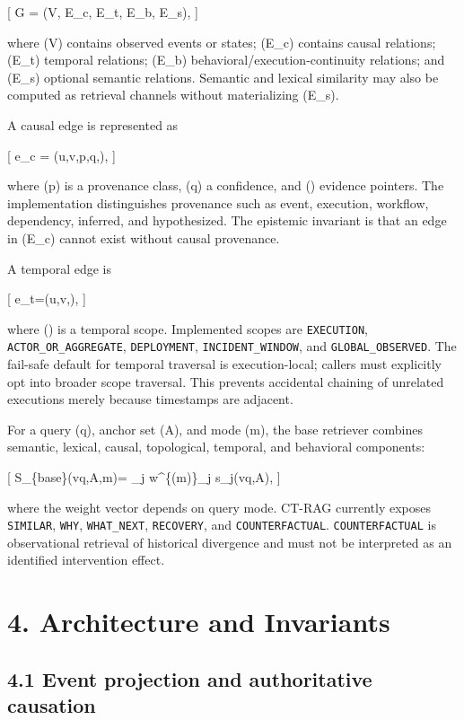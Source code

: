 \documentclass[
  11pt,
]{article}
\begin{document}
{[} G = (V, E\_c, E\_t, E\_b, E\_s), {]}

where (V) contains observed events or states; (E\_c) contains causal
relations; (E\_t) temporal relations; (E\_b)
behavioral/execution-continuity relations; and (E\_s) optional semantic
relations. Semantic and lexical similarity may also be computed as
retrieval channels without materializing (E\_s).

A causal edge is represented as

{[} e\_c = (u,v,p,q,), {]}

where (p) is a provenance class, (q\in[0,1]) a confidence, and
() evidence pointers. The implementation distinguishes
provenance such as event, execution, workflow, dependency, inferred, and
hypothesized. The epistemic invariant is that an edge in (E\_c) cannot
exist without causal provenance.

A temporal edge is

{[} e\_t=(u,v,\sigma), {]}

where (\sigma) is a temporal scope. Implemented scopes are
\texttt{EXECUTION}, \texttt{ACTOR\_OR\_AGGREGATE}, \texttt{DEPLOYMENT},
\texttt{INCIDENT\_WINDOW}, and \texttt{GLOBAL\_OBSERVED}. The fail-safe
default for temporal traversal is execution-local; callers must
explicitly opt into broader scope traversal. This prevents accidental
chaining of unrelated executions merely because timestamps are adjacent.

For a query (q), anchor set (A), and mode (m), the base retriever
combines semantic, lexical, causal, topological, temporal, and
behavioral components:

{[} S\_\{base\}(v\mid q,A,m)= \sum\_j w\^{}\{(m)\}\_j s\_j(v\mid q,A),
{]}

where the weight vector depends on query mode. CT-RAG currently exposes
\texttt{SIMILAR}, \texttt{WHY}, \texttt{WHAT\_NEXT}, \texttt{RECOVERY},
and \texttt{COUNTERFACTUAL}. \texttt{COUNTERFACTUAL} is observational
retrieval of historical divergence and must not be interpreted as an
identified intervention effect.

\section{4. Architecture and
Invariants}\label{architecture-and-invariants}

\subsection{4.1 Event projection and authoritative
causation}\label{event-projection-and-authoritative-causation}
\end{document}
